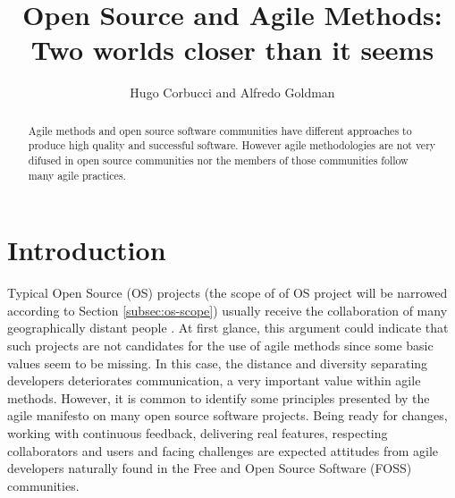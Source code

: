 \documentclass[lnbip]{svmultln}
\begin{document}
\mainmatter

\title{Open Source and Agile Methods:\\Two worlds closer than it
  seems}


\author{Hugo Corbucci and Alfredo Goldman}



 
\maketitle

\begin{abstract}
  Agile methods and open source software communities have different
  approaches to produce high quality and successful software. However
  agile methodologies are not very difused in open source communities
  nor the members of those communities follow many agile
  practices.

\end{abstract}

\section{Introduction}

Typical Open Source (OS) projects (the scope of of OS project will be
narrowed according to Section \ref{subsec:os-scope}) usually receive
the collaboration of many geographically distant people
\cite{report:dempsey1999}. At first glance, this argument could
indicate that such projects are not candidates for the use of agile
methods since some basic values seem to be missing. In this case, the
distance and diversity separating developers deteriorates
communication, a very important value within agile methods. However,
it is common to identify some principles presented by the agile
manifesto \cite{url:agilemanifesto} on many open source software
projects. Being ready for changes, working with continuous feedback,
delivering real features, respecting collaborators and users and
facing challenges are expected attitudes from agile developers
naturally found in the Free and Open Source Software (FOSS)
communities\cite{gabriel2005}.
\end{document}
